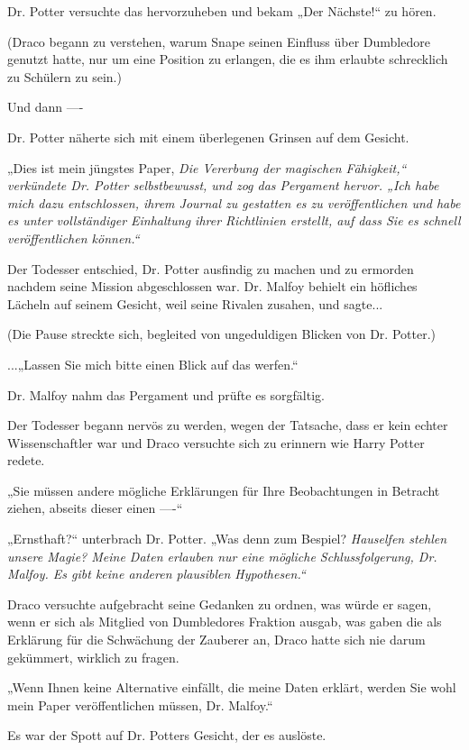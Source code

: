 {Dr. Potter versuchte das hervorzuheben und bekam „Der Nächste!“ zu hören.

(Draco begann zu verstehen, warum Snape seinen Einfluss über Dumbledore genutzt hatte, nur um eine Position zu erlangen, die es ihm erlaubte schrecklich zu Schülern zu sein.)

Und dann ----

Dr. Potter näherte sich mit einem überlegenen Grinsen auf dem Gesicht.

„Dies ist mein jüngstes Paper, \emph{Die Vererbung der magischen Fähigkeit,“ verkündete Dr. Potter selbstbewusst, und zog das Pergament hervor. „Ich habe mich dazu entschlossen, ihrem Journal zu gestatten es zu veröffentlichen und habe es unter vollständiger Einhaltung ihrer Richtlinien erstellt, auf dass Sie es schnell veröffentlichen können.“}

Der Todesser entschied, Dr. Potter ausfindig zu machen und zu ermorden nachdem seine Mission abgeschlossen war. Dr. Malfoy behielt ein höfliches Lächeln auf seinem Gesicht, weil seine Rivalen zusahen, und sagte...

(Die Pause streckte sich, begleited von ungeduldigen Blicken von Dr. Potter.)

...„Lassen Sie mich bitte einen Blick auf das werfen.“

Dr. Malfoy nahm das Pergament und prüfte es sorgfältig.

Der Todesser begann nervös zu werden, wegen der Tatsache, dass er kein echter Wissenschaftler war und Draco versuchte sich zu erinnern wie Harry Potter redete.

„Sie müssen andere mögliche Erklärungen für Ihre Beobachtungen in Betracht ziehen, abseits dieser einen ----“

„Ernsthaft?“ unterbrach Dr. Potter. „Was denn zum Bespiel? \emph{Hauselfen stehlen unsere Magie? Meine Daten erlauben nur eine mögliche Schlussfolgerung, Dr. Malfoy. Es gibt keine anderen plausiblen Hypothesen.“}

Draco versuchte aufgebracht seine Gedanken zu ordnen, was würde er sagen, wenn er sich als Mitglied von Dumbledores Fraktion ausgab, was gaben die als Erklärung für die Schwächung der Zauberer an, Draco hatte sich nie darum gekümmert, wirklich zu fragen.

„Wenn Ihnen keine Alternative einfällt, die meine Daten erklärt, werden Sie wohl mein Paper veröffentlichen müssen, Dr. Malfoy.“

Es war der Spott auf Dr. Potters Gesicht, der es auslöste.

}
